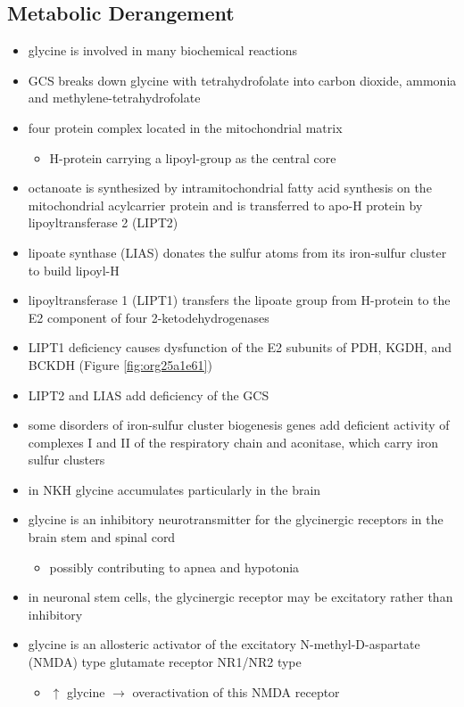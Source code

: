 \documentclass[12pt]{scrartcl}
\begin{document}
\begin{center}
\begin{center}
\subsection{Metabolic Derangement}
\label{sec:org5e491b8}
\begin{itemize}
\item glycine is involved in many biochemical reactions
\item GCS breaks down glycine with tetrahydrofolate into carbon dioxide,
ammonia and methylene-tetrahydrofolate
\item four protein complex located in the mitochondrial matrix
\begin{itemize}
\item H-protein carrying a lipoyl-group as the central core
\end{itemize}
\item octanoate is synthesized by intramitochondrial fatty acid synthesis
on the mitochondrial acylcarrier protein and is transferred to apo-H
protein by lipoyltransferase 2 (LIPT2)
\item lipoate synthase (LIAS) donates the sulfur atoms from its
iron-sulfur cluster to build lipoyl-H
\item lipoyltransferase 1 (LIPT1) transfers the lipoate group from
H-protein to the E2 component of four 2-ketodehydrogenases
\item LIPT1 deficiency causes dysfunction of the E2 subunits of PDH, KGDH,
and BCKDH (Figure \ref{fig:org25a1e61})
\item LIPT2 and LIAS add deficiency of the GCS
\item some disorders of iron-sulfur cluster biogenesis genes add deficient
activity of complexes I and II of the respiratory chain and
aconitase, which carry iron sulfur clusters
\item in NKH glycine accumulates particularly in the brain
\item glycine is an inhibitory neurotransmitter for the glycinergic
receptors in the brain stem and spinal cord
\begin{itemize}
\item possibly contributing to apnea and hypotonia
\end{itemize}
\item in neuronal stem cells, the glycinergic receptor may be excitatory
rather than inhibitory
\item glycine is an allosteric activator of the excitatory
N-methyl-D-aspartate (NMDA) type glutamate receptor NR1/NR2 type
\begin{itemize}
\item \(\uparrow\) glycine \(\to\) overactivation of this NMDA receptor
\end{itemize}
\end{itemize}

\end{center}
\end{center}
\end{document}
